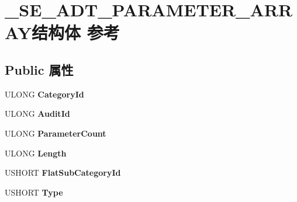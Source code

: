 \hypertarget{struct___s_e___a_d_t___p_a_r_a_m_e_t_e_r___a_r_r_a_y}{}\section{\+\_\+\+S\+E\+\_\+\+A\+D\+T\+\_\+\+P\+A\+R\+A\+M\+E\+T\+E\+R\+\_\+\+A\+R\+R\+A\+Y结构体 参考}
\label{struct___s_e___a_d_t___p_a_r_a_m_e_t_e_r___a_r_r_a_y}
\subsection*{Public 属性}
\begin{DoxyCompactItemize}
\item 
\mbox{\label{struct___s_e___a_d_t___p_a_r_a_m_e_t_e_r___a_r_r_a_y_aea0cc2358f5e4a71fff7d591a271de6c}} 
U\+L\+O\+NG {\bfseries Category\+Id}
\item 
\mbox{\label{struct___s_e___a_d_t___p_a_r_a_m_e_t_e_r___a_r_r_a_y_a9e92b9b198587129a40080d9384f3281}} 
U\+L\+O\+NG {\bfseries Audit\+Id}
\item 
\mbox{\label{struct___s_e___a_d_t___p_a_r_a_m_e_t_e_r___a_r_r_a_y_ace219792bc5a93f01ce0a41d888dfbd3}} 
U\+L\+O\+NG {\bfseries Parameter\+Count}
\item 
\mbox{\label{struct___s_e___a_d_t___p_a_r_a_m_e_t_e_r___a_r_r_a_y_a72e9d4b7c49196240b324cbf986510f7}} 
U\+L\+O\+NG {\bfseries Length}
\item 
\mbox{\label{struct___s_e___a_d_t___p_a_r_a_m_e_t_e_r___a_r_r_a_y_aa9214a77fa1af2b7843b73864ed7d96d}} 
U\+S\+H\+O\+RT {\bfseries Flat\+Sub\+Category\+Id}
\item 
\mbox{\label{struct___s_e___a_d_t___p_a_r_a_m_e_t_e_r___a_r_r_a_y_a64d7426b1fd61d2fd23e514127d92b34}} 
U\+S\+H\+O\+RT {\bfseries Type}
\item 
\mbox{\label{struct___s_e___a_d_t___p_a_r_a_m_e_t_e_r___a_r_r_a_y_aa9af4fd1779f42505db65fa9453375e4}} 

\end{DoxyCompactItemize}
